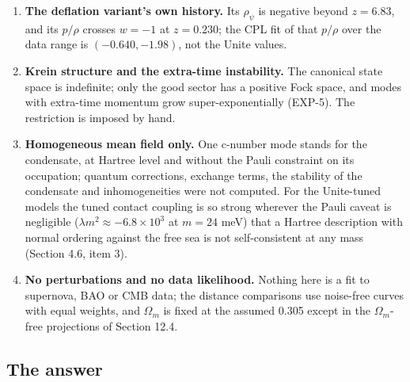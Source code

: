\documentclass[11pt]{article}
\begin{document}
\begin{enumerate}
\item \textbf{The deflation variant's own history.} Its $\rho_\psi$ is negative beyond $z=6.83$, and its $p/\rho$ crosses $w=-1$ at $z=0.230$; the CPL fit of that $p/\rho$ over the data range is $(-0.640,-1.98)$, not the Unite values.
\item \textbf{Krein structure and the extra-time instability.} The canonical state space is indefinite; only the good sector has a positive Fock space, and modes with extra-time momentum grow super-exponentially (EXP-5). The restriction is imposed by hand.
\item \textbf{Homogeneous mean field only.} One c-number mode stands for the condensate, at Hartree level and without the Pauli constraint on its occupation; quantum corrections, exchange terms, the stability of the condensate and inhomogeneities were not computed. For the Unite-tuned models the tuned contact coupling is so strong wherever the Pauli caveat is negligible ($\lambda m^2\approx-6.8\times10^{3}$ at $m=24$ meV) that a Hartree description with normal ordering against the free sea is not self-consistent at any mass (Section 4.6, item 3).
\item \textbf{No perturbations and no data likelihood.} Nothing here is a fit to supernova, BAO or CMB data; the distance comparisons use noise-free curves with equal weights, and $\Omega_m$ is fixed at the assumed 0.305 except in the $\Omega_m$-free projections of Section 12.4.
\end{enumerate}

\subsection{The answer}
\end{document}
